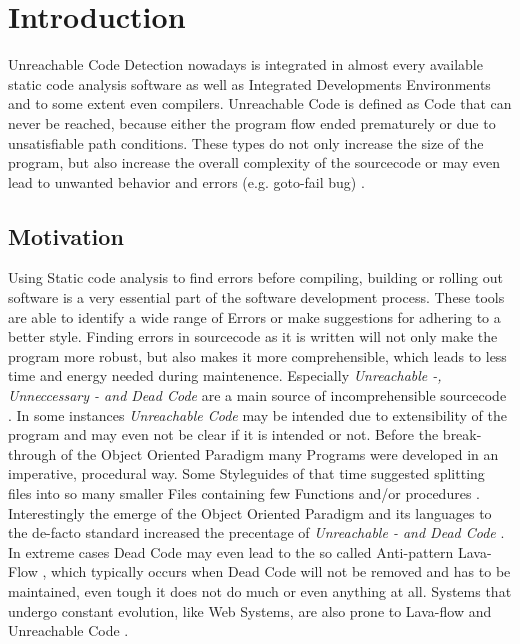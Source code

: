 \chapter{Introduction}
\label{cha:introduction}

Unreachable Code Detection nowadays is integrated in almost every available static code analysis software as well as Integrated Developments Environments and to some extent even compilers.
Unreachable Code is defined as Code that can never be reached, because either the program flow ended prematurely or due to unsatisfiable path conditions.
These types do not only increase the size of the program, but also increase the overall complexity of the sourcecode or may even lead to unwanted behavior and errors (e.g. goto-fail bug) \cite{Boyes_2014}.

\section{Motivation}
Using Static code analysis to find errors before compiling, building or rolling out software is a very essential part of the software development process.
These tools are able to identify a wide range of Errors or make suggestions for adhering to a better style.
Finding errors in sourcecode as it is written will not only make the program more robust, but also makes it more comprehensible, which leads to less time and energy needed during maintenence.
Especially \emph{Unreachable -, Unneccessary - and Dead Code} are a main source of incomprehensible sourcecode \cite{Romano_2020}.
In some instances \emph{Unreachable Code} may be intended due to extensibility of the program \cite{Haas_2020} and may even not be clear if it is intended or not.
Before the break-through of the Object Oriented Paradigm many Programs were developed in an imperative, procedural way. Some Styleguides of that time suggested splitting files into so many smaller Files containing few Functions and/or procedures \cite{Srivastava_1992}.
Interestingly the emerge of the Object Oriented Paradigm and its languages to the de-facto standard increased the precentage of \emph{Unreachable - and Dead Code} \cite{Srivastava_1992}.
In extreme cases Dead Code may even lead to the so called Anti-pattern Lava-Flow \cite{Romano_2020}, which typically occurs when Dead Code will not be removed and has to be maintained, even tough it does not do much or even anything at all.
Systems that undergo constant evolution, like Web Systems, are also prone to Lava-flow and Unreachable Code \cite{Boomsma_2012}.

